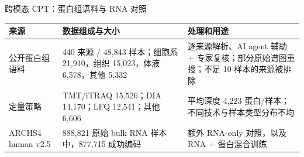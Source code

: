 \begin{frame}[t]{跨模态 CPT：蛋白组语料与 RNA 对照}
\fontsize{8.8}{12}\selectfont\renewcommand{\arraystretch}{1.14}
\begin{tabularx}{\textwidth}{@{}P{2.5cm}Y Y@{}}
\toprule\textbf{来源}&\textbf{数据组成与大小}&\textbf{处理和用途}\\\midrule
公开蛋白组语料 & 440 来源 / 48,843 样本；细胞系 21,910，组织 15,023，体液 6,578，其他 5,332 & 逐来源解析、AI agent 辅助 + 专家复核；部分原始谱图重搜；不足 10 样本的来源被排除\\
定量策略 & TMT/iTRAQ 15,526；DIA 14,170；LFQ 12,541；其他 6,606 & 平均深度 4,223 蛋白/样本；不同技术与样本类型分布不均\\
ARCHS4 human v2.5 & 888,821 原始 bulk RNA 样本中，877,715 成功编码 & 额外 RNA-only 对照，以及 RNA + 蛋白混合训练\\
\bottomrule
\end{tabularx}
\vspace{.22cm}
\end{frame}
